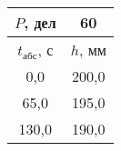 \begin{tabular}[t]{|c|c|}
\hline
$P$, дел & 60 \\
\hline
$t_{абс}$, с & $h$, мм \\ 
\hline
0,0 & 200,0 \\ 
65,0 & 195,0 \\ 
130,0 & 190,0 \\ 
\hline
\end{tabular}